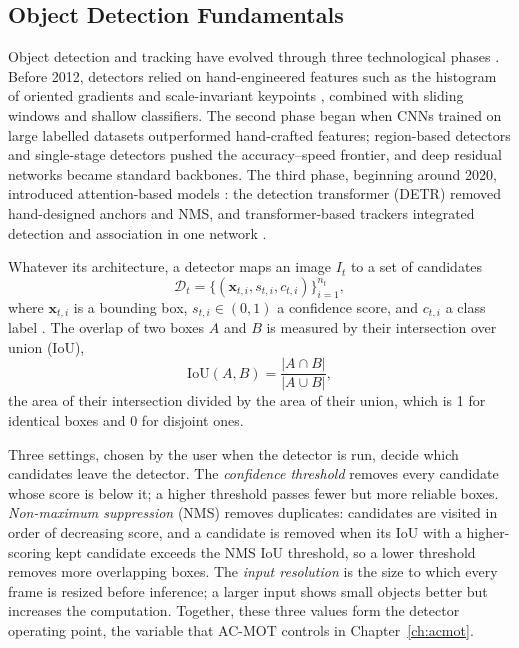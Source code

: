 \subsection{Object Detection Fundamentals}\label{sec:bg-detection}
Object detection and tracking have evolved through three technological phases \cite{li2025motreview,ismail2026realtime}. Before 2012, detectors relied on hand-engineered features such as the histogram of oriented gradients \cite{dalal2005hog} and scale-invariant keypoints \cite{lowe2004sift}, combined with sliding windows and shallow classifiers. The second phase began when CNNs trained on large labelled datasets \cite{krizhevsky2017alexnet,russakovsky2015imagenet} outperformed hand-crafted features; region-based detectors \cite{girshick2014rcnn,ren2017fasterrcnn} and single-stage detectors \cite{redmon2016yolo,liu2016ssd} pushed the accuracy--speed frontier, and deep residual networks \cite{he2016resnet} became standard backbones. The third phase, beginning around 2020, introduced attention-based models \cite{vaswani2017attention,dosovitskiy2021vit}: the detection transformer (DETR) \cite{carion2020detr} removed hand-designed anchors and NMS, and transformer-based trackers integrated detection and association in one network \cite{sun2020transtrack,meinhardt2022trackformer,zeng2022motr}.

Whatever its architecture, a detector maps an image $I_t$ to a set of candidates
\begin{equation}
\mathcal{D}_t = \{(\mathbf{x}_{t,i}, s_{t,i}, c_{t,i})\}_{i=1}^{n_t},
\label{eq:bg-dets}
\end{equation}
where $\mathbf{x}_{t,i}$ is a bounding box, $s_{t,i}\in(0,1)$ a confidence score, and $c_{t,i}$ a class label \cite{ismail2026realtime}. The overlap of two boxes $A$ and $B$ is measured by their intersection over union (IoU),
\begin{equation}
\mathrm{IoU}(A,B)=\frac{|A\cap B|}{|A\cup B|},
\label{eq:bg-iou}
\end{equation}
the area of their intersection divided by the area of their union, which is 1 for identical boxes and 0 for disjoint ones.

Three settings, chosen by the user when the detector is run, decide which candidates leave the detector. The \emph{confidence threshold} removes every candidate whose score is below it; a higher threshold passes fewer but more reliable boxes. \emph{Non-maximum suppression} (NMS) removes duplicates: candidates are visited in order of decreasing score, and a candidate is removed when its IoU with a higher-scoring kept candidate exceeds the NMS IoU threshold, so a lower threshold removes more overlapping boxes. The \emph{input resolution} is the size to which every frame is resized before inference; a larger input shows small objects better but increases the computation. Together, these three values form the detector operating point, the variable that AC-MOT controls in Chapter~\ref{ch:acmot}.

